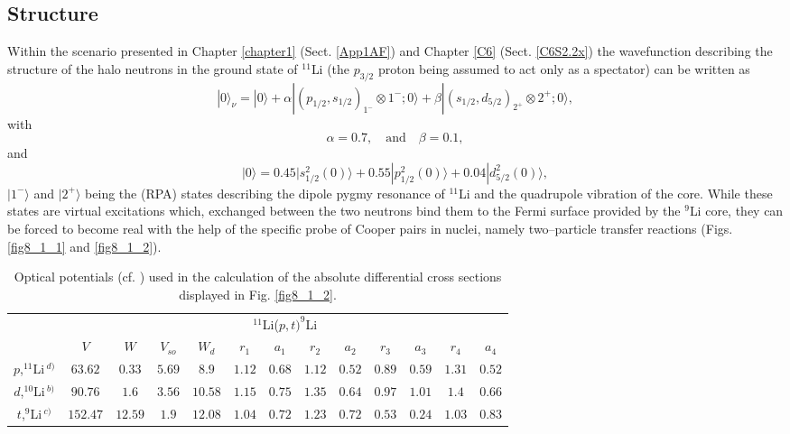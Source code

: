 \subsection{Structure}
Within the scenario presented in Chapter \ref{chapter1}  (Sect. \ref{App1AF}) and Chapter \ref{C6} (Sect. \ref{C6S2.2x}) the wavefunction describing the structure of the halo neutrons in the ground state of $^{11}$Li (the $p_{3/2}$ proton being assumed to act only as a spectator) can be written as
\begin{equation}\label{eq8_2_1}
|0\rangle_\nu=|0\rangle+\alpha|(p_{1/2},s_{1/2})_{1^-}\otimes 1^-;0\rangle+\beta|(s_{1/2},d_{5/2})_{2^+}\otimes 2^+;0\rangle,
\end{equation}
with
\begin{equation}\label{eq8_2_2}
\alpha=0.7,\quad \text{and} \quad \beta=0.1,
\end{equation}
and
\begin{equation}\label{eq8_2_3}
|0\rangle=0.45|s_{1/2}^2(0)\rangle+0.55|p_{1/2}^2(0)\rangle+0.04|d_{5/2}^2(0)\rangle,
\end{equation}
$|1^-\rangle$ and $|2^+\rangle$ being the (RPA) states describing the dipole pygmy resonance of $^{11}$Li and the quadrupole vibration of the core. While these states are virtual excitations which, exchanged between the two neutrons bind them to the Fermi surface provided by the $^9$Li core, they can be forced to become real with the help of the specific probe of Cooper pairs in nuclei, namely two--particle transfer reactions (Figs. \ref{fig8_1_1} and \ref{fig8_1_2}).
\begin{table}[h!]
{\begin{tabular}{|c|c|c|c|c|c|c|c|c|c|c|c|c|}
\cline{2-13} 
\multicolumn{1}{c|}{}& \multicolumn{12}{|c|}{$^{11}$Li($p,t)^{9}$Li}           \\
\cline{2-13} 
\multicolumn{1}{c|}{} & $V$ & $W$ &  $V_{so}$ &  $W_d$ &  $r_1$ &  $a_1$ &  $r_2$ &  $a_2$ &  $r_3$ &  $a_3$ &  $r_4$ &  $a_4$            \\
\hline 
$p$,\;$^{11}$Li$\,^{d)}$ & $63.62$ & $0.33$ &  $5.69$ &  $8.9$ &  $1.12$ &  $0.68$ &  $1.12$ &  $0.52$ &  $0.89$ &  $0.59$ &  $1.31$ &  $0.52$ \\
\hline 
$d$,\;$^{10}$Li$\,^{b)}$ & $90.76$ & $1.6$ &  $3.56$ &  $10.58$ &  $1.15$ &  $0.75$ &  $1.35$ &  $0.64$ &  $0.97$ &  $1.01$ &  $1.4$ &  $0.66$ \\
\hline 
$t$,\;$^{9}$Li$\,^{c)}$ & $152.47$ & $12.59$ &  $1.9$ &  $12.08$ &  $1.04$ &  $0.72$ &  $1.23$ &  $0.72$ &  $0.53$ &  $0.24$ &  $1.03$ &  $0.83$ \\
\hline 

\hline 
  \end{tabular}}
   \caption{Optical potentials (cf. \cite{Tanihata:08}) used in the calculation of the absolute differential cross sections displayed in Fig. \ref{fig8_1_2}.}
\label{tab8.1.1}
\end{table}


